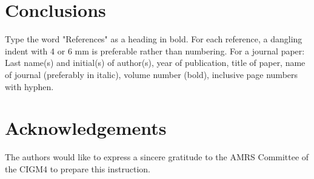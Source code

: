 \documentclass[times,twoside,5p]{ajam}
\begin{document}
\section{Conclusions}
\label{S:2}

Type the word "References" as a heading in bold. For each reference, a dangling indent with 4 or 6 mm is preferable rather than numbering. For a journal paper: Last name(s) and initial(s) of author(s), year of publication, title of paper, name of journal (preferably in italic), volume number (bold), inclusive page numbers with hyphen.

\section{Acknowledgements}
\label{S:3}

The authors would like to express a sincere gratitude to the AMRS Committee of the CIGM4 to prepare this instruction.

\begin{thebibliography}{30} %



\end{thebibliography}
 
\end{document}

